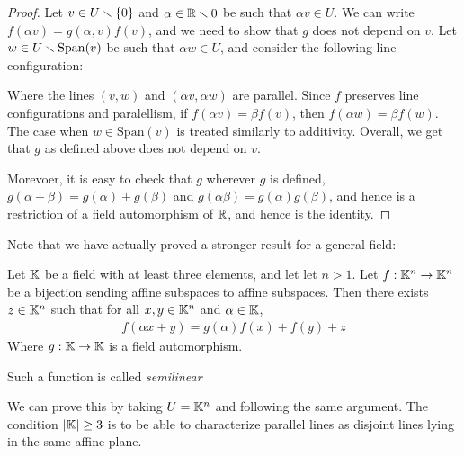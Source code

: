 \begin{proof}
	Let $v\in U\smallsetminus \{0\}$ and $\alpha \in \mathbb{R}\smallsetminus 0$ be such that 
	$\alpha v\in U$. We can write $f(\alpha v) = g(\alpha,v)f(v)$, and
	we need to show that $g$ does not depend on $v$. Let
	$w\in U\smallsetminus \mathrm{Span}(v)$ be such that $\alpha w\in U$, 
	and consider the following line configuration:
	\begin{figure}
		\centering
	\end{figure}
	Where the lines $(v,w)$ and $(\alpha v,\alpha w)$ are parallel. 
	Since $f$ preserves line configurations and paralellism, if 
	$f(\alpha v) = \beta f(v)$, then 
	$f(\alpha w) = \beta f(w)$. The case when 
	$w\in \mathrm{Span}(v)$ is treated similarly to additivity. 
	Overall, we get that $g$ as defined above 
	does not depend on $v$.
	
	Morevoer, it is easy to check that $g$ wherever 
	$g$ is defined, $g(\alpha+\beta) = g(\alpha) + g(\beta)$ 
	and $g(\alpha\beta) = g(\alpha)g(\beta)$, and hence 
	is a restriction of a field 
	automorphism of $\mathbb{R}$, and hence is the identity.
\end{proof}
Note that we have actually proved a stronger result 
for a general field:
\begin{theorem}
	Let $\mathbb{K}$ be a field with at least three elements, and 
	let let $n>1$. Let $f:\mathbb{K}^n\to \mathbb{K}^n$ be a bijection sending 
	affine subspaces to affine subspaces. Then 
	there exists $z\in \mathbb{K}^n$ such that for all 
	$x,y\in \mathbb{K}^n$ and $\alpha\in \mathbb{K}$,
	\begin{align*}
	f(\alpha x + y) = g(\alpha)f(x) + f(y) + z
	\end{align*}
	Where $g:\mathbb{K}\to\mathbb{K}$ is a field automorphism.
	
	Such a function is called \textit{semilinear}
\end{theorem}
We can prove this by taking $U = \mathbb{K}^n$ and following the same argument. 
The condition $|\mathbb{K}|\ge 3$ is to be able to characterize 
parallel lines as disjoint lines lying in the same affine plane.

